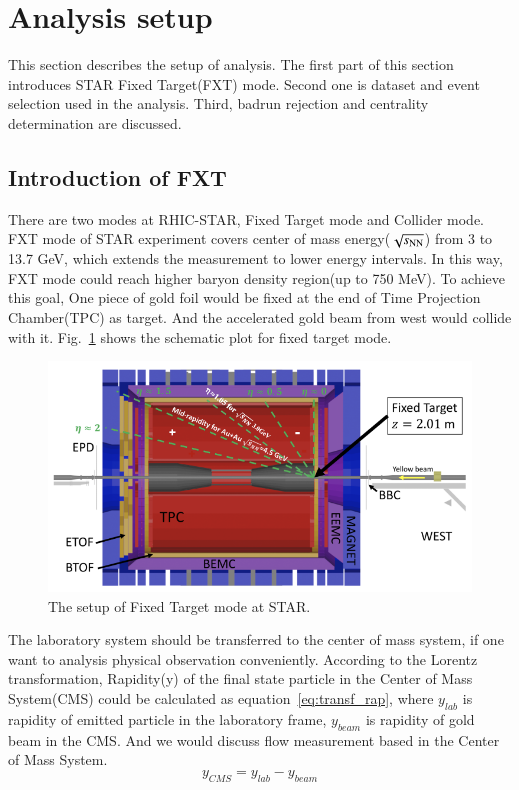 
\section{Analysis setup}

This section describes the setup of analysis. 
The first part of this section introduces STAR Fixed Target(FXT) mode. 
Second one is dataset and event selection used in the analysis. 
Third, badrun rejection and centrality determination are discussed.

\subsection{Introduction of FXT}

There are two modes at RHIC-STAR, Fixed Target mode and Collider mode. 
FXT mode of STAR experiment covers center of mass energy($\sqrt{s_\text{NN}}$) from 3 to 13.7 GeV, which extends the measurement to lower energy intervals.
In this way, FXT mode could reach higher baryon density region(up to 750 MeV). 
To achieve this goal, One piece of gold foil would be fixed at the end of Time Projection Chamber(TPC) as target.\cite{PhysRevC.103.034908}
And the accelerated gold beam from west would collide with it. Fig.~\ref{fig:FXTmode} shows the schematic plot for fixed target mode.
\begin{figure}[hbt!]
\centering
\includegraphics[width=0.45\linewidth]{figures/chapter01/FXTmode.png}
\caption{The setup of Fixed Target mode at STAR.}
\label{fig:FXTmode}
\end{figure}

The laboratory system should be transferred to the center of mass system, 
if one want to analysis physical observation conveniently. 
According to the Lorentz transformation, Rapidity(y) of the final state particle in the Center of Mass System(CMS) could be calculated as equation~\ref{eq:transf_rap}, 
where $y_{lab}$ is rapidity of emitted particle in the laboratory frame, $y_{beam}$ is rapidity of gold beam in the CMS.
And we would discuss flow measurement based in the Center of Mass System.
\begin{equation}
    y_{CMS} = y_{lab} - y_{beam}
\label{eq:transf_rap}
\end{equation}

